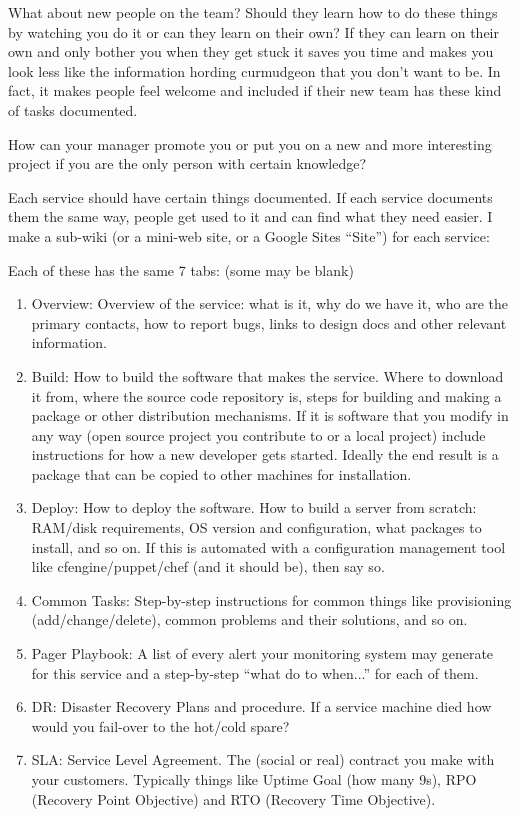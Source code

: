 \documentclass{article}
\begin{document}
What about new people on the team? Should they learn how to do these things by watching you do it or can they learn on their own? If they can learn on their own and only bother you when they get stuck it saves you time and makes you look less like the information hording curmudgeon that you don't want to be. In fact, it makes people feel welcome and included if their new team has these kind of tasks documented.

How can your manager promote you or put you on a new and more interesting project if you are the only person with certain knowledge?

Each service should have certain things documented. If each service documents them the same way, people get used to it and can find what they need easier. I make a sub-wiki (or a mini-web site, or a Google Sites ``Site'') for each service:

Each of these has the same 7 tabs: (some may be blank)

\begin{enumerate}
    \item Overview: Overview of the service: what is it, why do we have it, who are the primary contacts, how to report bugs, links to design docs and other relevant information.
    \item Build: How to build the software that makes the service. Where to download it from, where the source code repository is, steps for building and making a package or other distribution mechanisms. If it is software that you modify in any way (open source project you contribute to or a local project) include instructions for how a new developer gets started. Ideally the end result is a package that can be copied to other machines for installation.
    \item Deploy: How to deploy the software. How to build a server from scratch: RAM/disk requirements, OS version and configuration, what packages to install, and so on. If this is automated with a configuration management tool like cfengine/puppet/chef (and it should be), then say so.
    \item Common Tasks: Step-by-step instructions for common things like provisioning (add/change/delete), common problems and their solutions, and so on.
    \item Pager Playbook: A list of every alert your monitoring system may generate for this service and a step-by-step ``what do to when...'' for each of them.
    \item DR: Disaster Recovery Plans and procedure. If a service machine died how would you fail-over to the hot/cold spare?
    \item SLA: Service Level Agreement. The (social or real) contract you make with your customers. Typically things like Uptime Goal (how many 9s), RPO (Recovery Point Objective) and RTO (Recovery Time Objective).
\end{enumerate}
\end{document}
